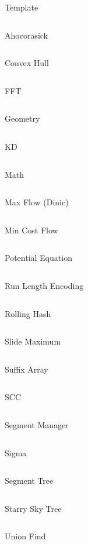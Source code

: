 \documentclass[10pt,a4paper]{jsarticle}
\newcommand{\library}[2]{
    {\large #2}
    \vspace{-10pt}
    \inputminted{c++}{#1}
}
\begin{document}
\library{/Users/drafear/mylib/bin/src/kp_header.cpp}{Template}
\library{../ahocorasick.cpp}{Ahocorasick}
\library{../convex_hull_trick.cpp}{Convex Hull}
\library{../fft.cpp}{FFT}
\library{../geometry_comment.cpp}{Geometry}
\library{../kd.cpp}{KD}
\library{../math.cpp}{Math}
\library{../max_flow.cpp}{Max Flow (Dinic)}
\library{../min_cost_flow.cpp}{Min Cost Flow}
\library{../potential_eq.cpp}{Potential Equation}
\library{../rle.cpp}{Run Length Encoding}
\library{../rollinghash.cpp}{Rolling Hash}
\library{../maxset.cpp}{Slide Maximum}
\library{../sa.cpp}{Suffix Array}
\library{../scc.cpp}{SCC}
\library{../segment_manager.cpp}{Segment Manager}
\library{../sigma.cpp}{Sigma}
\library{../segtree2.cpp}{Segment Tree}
\library{../sst.cpp}{Starry Sky Tree}
\library{../unionfind.cpp}{Union Find}
\end{document}
